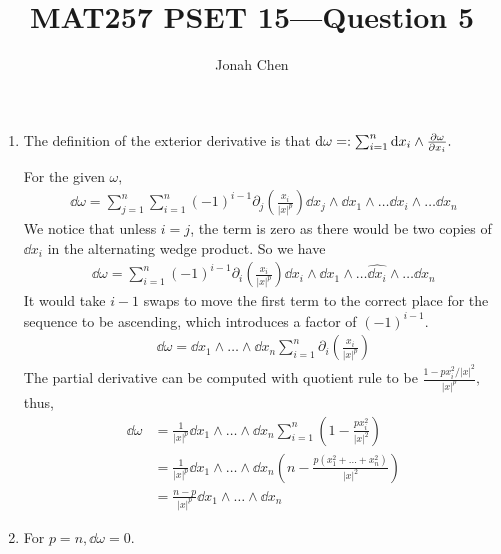 \documentclass{exam}
\title{MAT257 PSET 15---Question 5}
\author{Jonah Chen}
\date{}
\begin{document}
    \sffamily
    \maketitle

    \begin{enumerate}[label=\alph*)]
        \item The definition of the exterior derivative is that \(\dd\omega=:\sum_{i=1}^n\dd x_i\wedge\partialderivative{\omega}{x_i}.\)

        For the given \(\omega,\)
        \begin{align*}
            \dd\omega=\sum_{j=1}^n\sum_{i=1}^n(-1)^{i-1}\partial_j\left(\frac{x_i}{|x|^p}\right)\dd x_j\wedge\dd x_1\wedge\dots\hat{\dd x_i}\wedge\dots\dd x_n
        \end{align*}
        We notice that unless \(i=j\), the term is zero as there would be two copies of \(\dd x_i\) in the alternating wedge product. So we have
        \begin{align*}
            \dd\omega=\sum_{i=1}^n(-1)^{i-1}\partial_i\left(\frac{x_i}{|x|^p}\right)\dd x_i\wedge\dd x_1\wedge\dots\hat{\dd x_i}\wedge\dots\dd x_n
        \end{align*}
        It would take \(i-1\) swaps to move the first term to the correct place for the sequence to be ascending, which introduces a factor of \((-1)^{i-1}\).
        \begin{align*}
            \dd\omega=\dd x_1\wedge\dots\wedge\dd x_n\sum_{i=1}^n\partial_i\left(\frac{x_i}{|x|^p}\right)
        \end{align*}
        The partial derivative can be computed with quotient rule to be \(\frac{1-px_i^2/|x|^2}{|x|^p},\) thus,
        \begin{align*}
            \dd\omega&=\frac{1}{|x|^p}\dd x_1\wedge\dots\wedge\dd x_n\sum_{i=1}^n\left(1-\frac{px_i^2}{|x|^2}\right)\\
            &=\frac{1}{|x|^p}\dd x_1\wedge\dots\wedge\dd x_n\left(n-\frac{p(x_1^2+\dots+x_n^2)}{|x|^2}\right)\\
            &=\frac{n-p}{|x|^p}\dd x_1\wedge\dots\wedge\dd x_n
        \end{align*}
        \item For \(p=n, \dd\omega=0.\)
    \end{enumerate}
\end{document}
